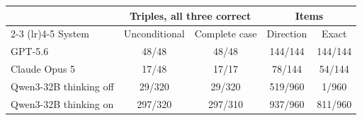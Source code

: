\begin{tabular}{lcccc}
\toprule
& \multicolumn{2}{c}{Triples, all three correct} & \multicolumn{2}{c}{Items} \\
\cmidrule(lr){2-3} \cmidrule(lr){4-5}
System & Unconditional & Complete case & Direction & Exact \\
\midrule
GPT-5.6 & 48/48 & 48/48 & 144/144 & 144/144 \\
Claude Opus 5 & 17/48 & 17/17 & 78/144 & 54/144 \\
Qwen3-32B thinking off & 29/320 & 29/320 & 519/960 & 1/960 \\
Qwen3-32B thinking on & 297/320 & 297/310 & 937/960 & 811/960 \\
\bottomrule
\end{tabular}
